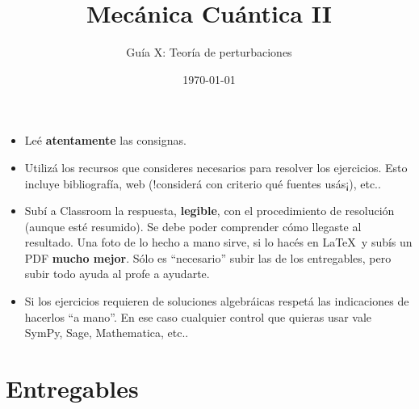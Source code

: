 \documentclass[a4paper,12pt]{article}
\begin{document}
\title{Mecánica Cuántica II}

\author{Guía X: Teoría de perturbaciones }

\date{\today}

\maketitle

\begin{itemize}
    \item Leé {\bf atentamente} las consignas.
    \item Utilizá los recursos que consideres necesarios para resolver los ejercicios. Esto incluye bibliografía, web (!considerá con criterio qué fuentes usás¡), etc..
    \item Subí a Classroom la respuesta, {\bf legible}, con el procedimiento de resolución (aunque esté resumido). Se debe poder comprender cómo llegaste al resultado. Una foto de lo hecho a mano sirve, si lo hacés en \LaTeX\ y subís un PDF {\bf mucho mejor}. Sólo es ``necesario'' subir las de los entregables, pero subir todo ayuda al profe a ayudarte.
    \item Si los ejercicios requieren de soluciones algebráicas respetá las indicaciones de hacerlos ``a mano''. En ese caso cualquier control que quieras usar vale SymPy, Sage, Mathematica, etc.. 
\end{itemize}

\section*{Entregables}
\end{document}
